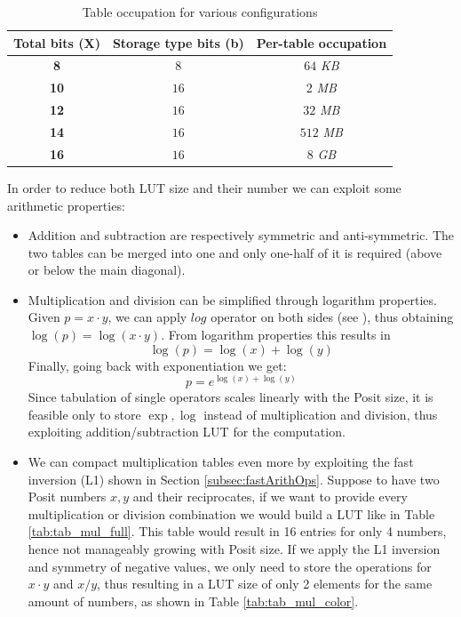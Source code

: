 \begin{table}[H]
\centering
\caption{Table occupation for various configurations}
\label{tab:table_occup}
\begin{tabular}{ccc}
\hline \textbf{Total bits (X)}
           & \textbf{Storage type bits (b)}   
           & \textbf{Per-table occupation}
\\ \hline
 \textbf{8} & $8$ & $64$ \textit{KB}\\ \hline
 \textbf{10} & $16$ & $2$ \textit{MB} \\ \hline
 \textbf{12}& $16$ & $32$ \textit{MB} \\ \hline
 \textbf{14}& $16$ & $512$ \textit{MB}\\ \hline
  \textbf{16} & $16$ & $8$ \textit{GB}\\ \hline
\end{tabular}
\end{table}


In order to reduce both LUT size and their number we can exploit some arithmetic properties:
\begin{itemize}
    \item Addition and subtraction are respectively symmetric and anti-symmetric. The two tables can be merged into one and only one-half of it is required (above or below the main diagonal).
    \item Multiplication and division can be simplified through logarithm properties. Given $p=x\cdot y$, we can apply $log$ operator on both sides (see \cite{arnold2003interval}), thus obtaining $\log(p) = \log(x\cdot y)$. From logarithm properties this results in \[\log(p) = \log(x)+\log(y)\] Finally, going back with exponentiation we get: \[ p = e^{\log(x)+\log(y)} \] Since tabulation of single operators scales linearly with the Posit size, it is feasible only to store $\exp,\log$ instead of multiplication and division, thus exploiting addition/subtraction LUT for the computation. 
    \item We can compact multiplication tables even more by exploiting the fast inversion (L1) shown in Section \ref{subsec:fastArithOps}. Suppose to have two Posit numbers $x,y$ and their reciprocates, if we want to provide every multiplication or division combination we would build a LUT like in Table \ref{tab:tab_mul_full}. This table would result in 16 entries for only 4 numbers, hence not manageably growing with Posit size. If we apply the L1 inversion and symmetry of negative values, we only need to store the operations for $x\cdot y$ and $x/y$, thus resulting in a LUT size of only 2 elements for the same amount of numbers, as shown in Table \ref{tab:tab_mul_color}.
\end{itemize}

